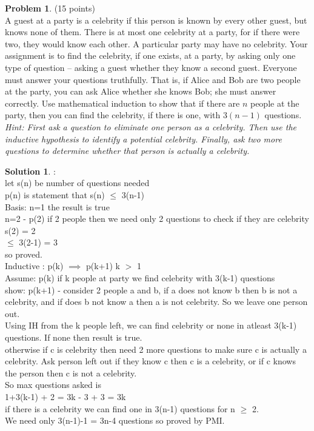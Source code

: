 \documentclass{article}
\theoremstyle{definition}
\newtheorem{problem}{Problem}
\newtheorem*{solution}{Solution}
\begin{document}
\begin{problem} (15 points) \\
A guest at a party is a celebrity if this person is known by every other guest, but knows none of them. There is at most one celebrity at a party, for if there were two, they would know each other. A particular party may have no celebrity. Your assignment is to find the celebrity, if one exists, at a party, by asking only one type of question -- asking a guest whether they know a second guest. Everyone must answer your questions truthfully. That is, if Alice and Bob are two people at the party, you can ask Alice whether she knows Bob; she must answer correctly. Use mathematical induction to show that if there are $n$ people at the party, then you can find the celebrity, if there is one, with $3(n-1)$ questions.\\
\textit{Hint: First ask a question to eliminate one person as a celebrity. Then use the inductive hypothesis to identify a potential celebrity. Finally, ask two more questions to determine whether that person is actually a celebrity.}
\end{problem}
\begin{solution} : \\

let s(n) be number of questions needed \\
p(n) is statement that s(n) $\leq$ 3(n-1) \\

Basis: n=1 the result is true\\
n=2 - p(2) if 2 people then we need only 2 questions to check if they are celebrity\\
s(2) = 2\\
$\leq$ 3(2-1) = 3\\
so proved.\\

Inductive : p(k) $\implies $ p(k+1) k $>$ 1
\\
Assume: p(k) if k people at party we find celebrity with 3(k-1) questions \\
show: p(k+1) - consider 2 people a and b, if a does not know b then b is not a celebrity, and if does b not know a then a is not celebrity. So we leave one person out. \\
Using IH from the k people left, we can find celebrity or none in atleast 3(k-1) questions. If none then result is true. \\

otherwise if c is celebrity then need 2 more questions to make sure c is actually a celebrity. Ask person left out if they know c then c is a celebrity, or if c knows the person then c is not a celebrity. \\
So max questions asked is \\
1+3(k-1) + 2 = 3k - 3 + 3 = 3k \\
if there is a celebrity we can find one in 3(n-1) questions for n $\geq$ 2. \\
We need only 3(n-1)-1 = 3n-4 questions so proved by PMI.
\end{solution}
\end{document}
